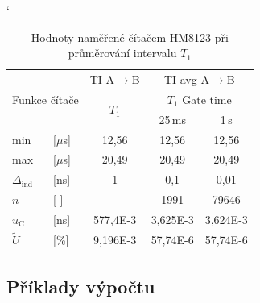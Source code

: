\documentclass[a4paper, czech]{article}
\begin{document}
\begin{table}[H]
    \catcode`
    \centering
    \caption{Hodnoty naměřené čítačem HM8123 při průměrování intervalu $T_1$}
    \begin{tabular}{ll|ccc}
        \toprule
        \multicolumn{2}{c}{\multirow{3}{*}{Funkce čítače}}     & TI A$\rightarrow$B              & \multicolumn{2}{c}{TI avg A$\rightarrow$B}   \\
        \cmidrule(rl){3-3}
        \cmidrule(rl){4-5}
        \multicolumn{2}{c}{\multirow{2}{*}{}} & \multirow{2}{*}{$T_1$} & \multicolumn{2}{c}{$T_1$ Gate time} \\
        \cmidrule(rl){4-5}
        \multicolumn{2}{c}{}                  &                     & 25\,ms           & 1\,s            \\
        \cmidrule(rl){1-5}
        min                & [$\mu$s]               & 12,56               & 12,56           & 12,56          \\
        max                & [$\mu$s]               & 20,49               & 20,49           & 20,49          \\
        $\Delta_\text{ind}$               & [ns]               & 1                   & 0,1             & 0,01           \\
        $n$                  & [-]                & -                   & 1991            & 79646          \\
        $u_\text{C}$                 & [ns]               & 577,4E-3            & 3,625E-3        & 3,624E-3       \\
        $\tilde{U}$                  & [\%]               & 9,196E-3            & 57,74E-6        & 57,74E-6       \\
        \bottomrule
    \end{tabular}
\end{table}

\subsection{Příklady výpočtu}
\end{document}
